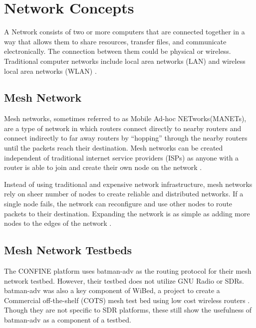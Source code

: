 
\section{Network Concepts}

A Network consists of two or more computers that are connected together in a way that allows them to share resources, transfer files, and communicate electronically. The connection between them could be physical or wireless. Traditional computer networks include local area networks (LAN) and wireless local area networks (WLAN) \cite{0029}. 

\subsection{Mesh Network}

Mesh networks, sometimes referred to as Mobile Ad-hoc NETworks(MANETs), are a type of network in which routers connect directly to nearby routers and connect indirectly to far away routers by ``hopping'' through the nearby routers until the packets reach their destination. Mesh networks can be created independent of traditional internet service providers (ISPs) as anyone with a router is able to join and create their own node on the network \cite{6908725}. 

Instead of using traditional and expensive network infrastructure, mesh networks rely on sheer number of nodes to create reliable and distributed networks. If a single node fails, the network can reconfigure and use other nodes to route packets to their destination. Expanding the network is as simple as adding more nodes to the edges of the network \cite{6908725}. 

\subsection{Mesh Network Testbeds}

The CONFINE platform uses batman-adv as the routing protocol for their mesh network testbed. However, their testbed does not utilize GNU Radio or SDRs. \cite{0001} batman-adv was also a key component of WiBed, a project to create a Commercial off-the-shelf (COTS) mesh test bed using low cost wireless routers \cite{6686492} \cite{6962154}. Though they are not specific to SDR platforms, these still show the usefulness of batman-adv as a component of a testbed. 

